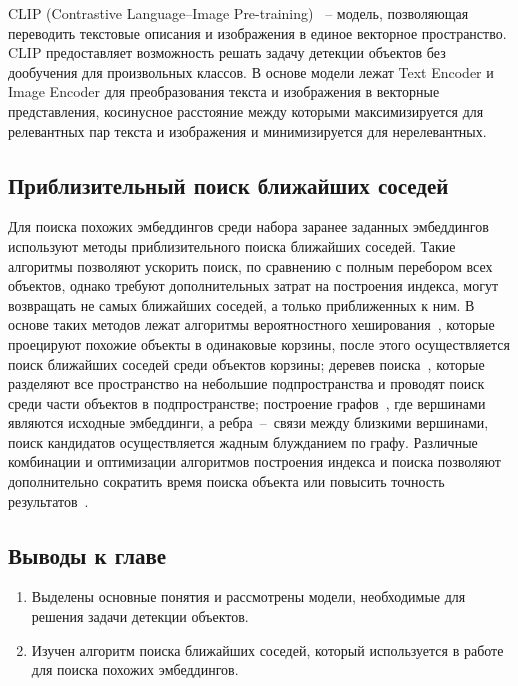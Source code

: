 \documentclass[a4paper,14pt]{article}
\begin{document}
    CLIP (Contrastive Language–Image Pre-training)~\cite{CLIP} -- модель, позволяющая переводить текстовые описания и изображения в единое векторное пространство.
    CLIP предоставляет возможность решать задачу детекции объектов без дообучения для произвольных классов.
    В основе модели лежат Text Encoder и Image Encoder для преобразования текста и изображения в векторные представления, косинусное расстояние между которыми максимизируется для релевантных пар текста и изображения и минимизируется для нерелевантных.

    \subsection{Приблизительный поиск ближайших соседей}

    Для поиска похожих эмбеддингов среди набора заранее заданных эмбеддингов используют методы приблизительного поиска ближайших соседей.
    Такие алгоритмы позволяют ускорить поиск, по сравнению с полным перебором всех объектов, однако требуют дополнительных затрат на построения индекса,
    могут возвращать не самых ближайших соседей, а только приближенных к ним.
    В основе таких методов лежат алгоритмы вероятностного хеширования~\cite{tao2010efficient}, которые проецируют похожие объекты в одинаковые корзины, после этого осуществляется поиск ближайших соседей среди объектов корзины;
    деревев поиска~\cite{liu2006new}, которые разделяют все пространство на небольшие подпространства и проводят поиск среди части объектов в подпространстве;
    построение графов~\cite{malkov2018efficient}, где вершинами являются исходные эмбеддинги, а
    ребра~--~связи между близкими вершинами, поиск кандидатов осуществляется жадным блужданием по графу.
    Различные комбинации и оптимизации алгоритмов построения индекса и поиска позволяют дополнительно сократить время поиска объекта или повысить точность результатов~\cite{annoy,avq_2020}.

    \subsection{Выводы к главе \thesection}
    \begin{enumerate}
        \itemsep0em
        \item Выделены основные понятия и рассмотрены модели, необходимые для решения задачи детекции объектов.
        \item Изучен алгоритм поиска ближайших соседей, который используется в работе для поиска похожих эмбеддингов.
    \end{enumerate}
\end{document}
